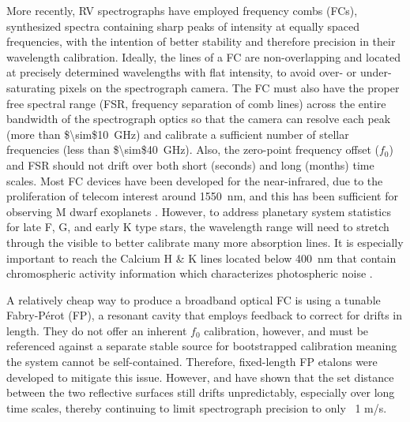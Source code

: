 \documentclass[11pt]{article}
\begin{document}
More recently, RV spectrographs have employed frequency combs (FCs), synthesized spectra containing sharp peaks of intensity at equally spaced frequencies, with the intention of better stability and therefore precision in their wavelength calibration. Ideally, the lines of a FC are non-overlapping and located at precisely determined wavelengths with flat intensity, to avoid over- or under-saturating pixels on the spectrograph camera. The FC must also have the proper free spectral range (FSR, frequency separation of comb lines) across the entire bandwidth of the spectrograph optics so that the camera can resolve each peak (more than \SI{$\sim$10}{\giga\hertz}) and calibrate a sufficient number of stellar frequencies (less than \SI{$\sim$40}{\giga\hertz}). Also, the zero-point frequency offset ($f_0$) and FSR should not drift over both short (seconds) and long (months) time scales. Most FC devices have been developed for the near-infrared, due to the proliferation of telecom interest around \SI{1550}{\nano\meter}, and this has been sufficient for observing M dwarf exoplanets \cite{Fischer2016}. However, to address planetary system statistics for late F, G, and early K type stars, the wavelength range will need to stretch through the visible to better calibrate many more absorption lines. It is especially important to reach the Calcium H & K lines located below \SI{400}{\nano\meter} that contain chromospheric activity information which characterizes photospheric noise \cite{Isaacson2010, Lovis2012}.

A relatively cheap way to produce a broadband optical FC is using a tunable Fabry-Pérot (FP), a resonant cavity that employs feedback to correct for drifts in length. They do not offer an inherent $f_0$ calibration, however, and must be referenced against a separate stable source for bootstrapped calibration \cite{McCracken2014, Sturmer2017} meaning the system cannot be self-contained. Therefore, fixed-length FP etalons were developed to mitigate this issue. However, \cite{Reiners2014} and \cite{Wildi2012} have shown that the set distance between the two reflective surfaces still drifts unpredictably, especially over long time scales, thereby continuing to limit spectrograph precision to only ~1 m/s.
\end{document}
